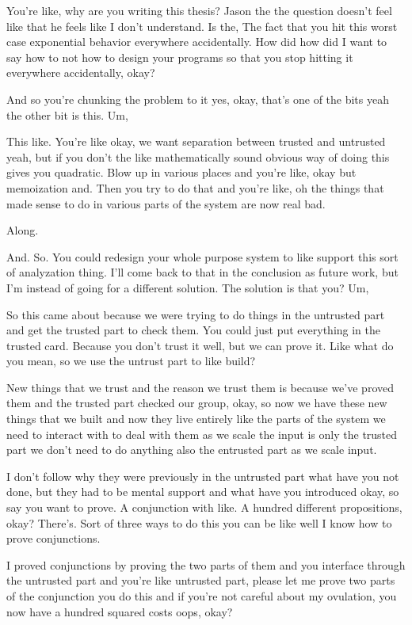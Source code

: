 \begin{subappendices}
    You're like, why are you writing this thesis? Jason the the question doesn't feel like that he feels like I don't understand. Is the, The fact that you hit this worst case exponential behavior everywhere accidentally. How did how did I want to say how to not how to design your programs so that you stop hitting it everywhere accidentally, okay? 
    
    And so you're chunking the problem to it yes, okay, that's one of the bits yeah the other bit is this. Um, 
    
    This like. You're like okay, we want separation between trusted and untrusted yeah, but if you don't the like mathematically sound obvious way of doing this gives you quadratic. Blow up in various places and you're like, okay but memoization and. Then you try to do that and you're like, oh the things that made sense to do in various parts of the system are now real bad. 
    
    Along. 
    
    And. So. You could redesign your whole purpose system to like support this sort of analyzation thing. I'll come back to that in the conclusion as future work, but I'm instead of going for a different solution. The solution is that you? Um, 
    
    So this came about because we were trying to do things in the untrusted part and get the trusted part to check them. You could just put everything in the trusted card. Because you don't trust it well, but we can prove it. Like what do you mean, so we use the untrust part to like build? 
    
    New things that we trust and the reason we trust them is because we've proved them and the trusted part checked our group, okay, so now we have these new things that we built and now they live entirely like the parts of the system we need to interact with to deal with them as we scale the input is only the trusted part we don't need to do anything also the entrusted part as we scale input. 
    
    I don't follow why they were previously in the untrusted part what have you not done, but they had to be mental support and what have you introduced okay, so say you want to prove. A conjunction with like. A hundred different propositions, okay? There's. Sort of three ways to do this you can be like well I know how to prove conjunctions. 
    
    I proved conjunctions by proving the two parts of them and you interface through the untrusted part and you're like untrusted part, please let me prove two parts of the conjunction you do this and if you're not careful about my ovulation, you now have a hundred squared costs oops, okay? 
    

\end{subappendices}

